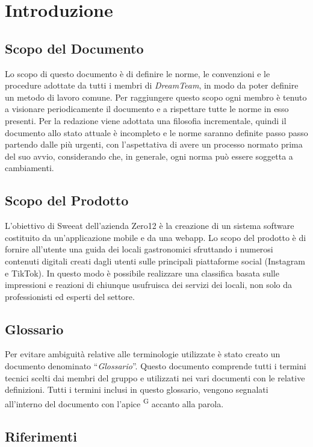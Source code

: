 \section{Introduzione}

\subsection{Scopo del Documento}
Lo scopo di questo documento è di definire le norme, le convenzioni e le procedure adottate da tutti i membri di \textit{DreamTeam}, in modo da poter definire un metodo di lavoro comune.
Per raggiungere questo scopo ogni membro è tenuto a visionare periodicamente il documento e a rispettare tutte le norme in esso presenti. 
Per la redazione viene adottata una filosofia incrementale, quindi il documento allo stato attuale è incompleto e le norme saranno definite passo passo partendo dalle più urgenti, con l'aspettativa di avere un processo normato prima del suo avvio, considerando che, in generale, ogni norma può essere soggetta a cambiamenti.


\subsection{Scopo del Prodotto}
L’obiettivo di Sweeat dell’azienda Zero12 è la creazione di un sistema software costituito da un’applicazione mobile e da una webapp. Lo scopo del prodotto è di fornire all’utente una guida dei locali gastronomici sfruttando i numerosi contenuti digitali creati dagli utenti sulle principali piattaforme social (Instagram e TikTok). In questo modo è possibile realizzare una classifica basata sulle impressioni e reazioni di chiunque usufruisca dei servizi dei locali, non solo da professionisti ed esperti del settore.


\subsection{Glossario}
Per evitare ambiguità relative alle terminologie utilizzate è stato creato un documento denominato “\textit{Glossario}”. Questo documento comprende tutti i termini tecnici scelti dai membri del gruppo e utilizzati nei vari documenti con le relative definizioni. Tutti i termini inclusi in questo glossario, vengono segnalati all’interno del documento con l’apice \textsuperscript{G} accanto alla parola.

\subsection{Riferimenti}

